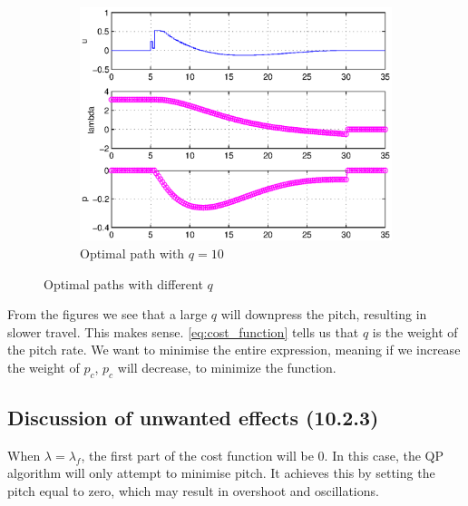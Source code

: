 \begin{figure}[H]
\begin{subfigure}[b]{0.5\textwidth}
                \includegraphics[width=\textwidth]{day2q10}
                \caption{Optimal path with $q = 10$}
                \label{fig:estimatedDay203}
        \end{subfigure}
        \caption{Optimal paths with different $q$}\label{fig:animals}
\end{figure}



From the figures we see that a large $q$ will downpress the pitch, resulting in slower travel. This makes sense. \eqref{eq:cost_function} tells us that $q$ is the weight of the pitch rate. We want to minimise the entire expression, meaning if we increase the weight of $p_c$, $p_c$ will decrease, to minimize the function.

\subsection{Discussion of unwanted effects (10.2.3)\label{unwanted}}
When $\lambda = \lambda_f$, the first part of the cost function will be 0. In this case, the QP algorithm will only attempt to minimise pitch. It achieves this by setting the pitch equal to zero, which may result in overshoot and oscillations.


